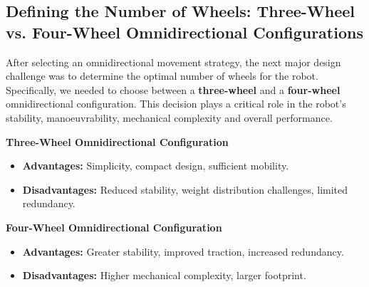 \subsection{Defining the Number of Wheels: Three-Wheel vs. Four-Wheel Omnidirectional Configurations}

After selecting an omnidirectional movement strategy, the next major design challenge was to determine the optimal number of wheels for the robot. Specifically, we needed to choose between a \textbf{three-wheel} and a \textbf{four-wheel} omnidirectional configuration. This decision plays a critical role in the robot's stability, manoeuvrability, mechanical complexity and overall performance.

\textbf{Three-Wheel Omnidirectional Configuration}
\begin{itemize}
    \item \textbf{Advantages:} Simplicity, compact design, sufficient mobility.
    \item \textbf{Disadvantages:} Reduced stability, weight distribution challenges, limited redundancy.
\end{itemize}

\textbf{Four-Wheel Omnidirectional Configuration}
\begin{itemize}
    \item \textbf{Advantages:} Greater stability, improved traction, increased redundancy.
    \item \textbf{Disadvantages:} Higher mechanical complexity, larger footprint.
\end{itemize}
